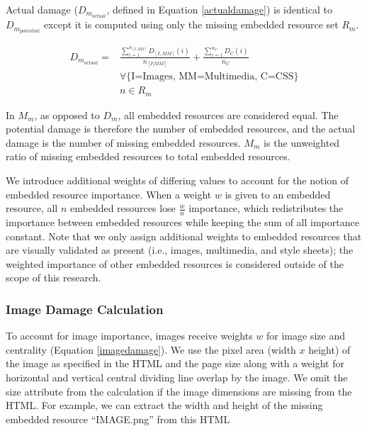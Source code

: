 Actual damage ($D_{m_{actual}}$, defined in Equation \ref{actualdamage}) is identical to $D_{m_{potential}}$ except it is computed using only the missing embedded resource set \emph{$R_m$}. %

\begin{equation}
\label{actualdamage}
\begin{split}
D_{m_{actual}} =& \frac{\sum_{i=1}^{n_{[I,MM]}} D_{[I,MM]}(i)}{n_{[I|MM]}} + \frac{\sum_{i=1}^{n_C} D_C(i)}{n_C} %
\\&\forall\{\text{I=Images, MM=Multimedia, C=CSS}\} \\&n \in R_m
\end{split}
\end{equation}


In $M_m$, as opposed to $D_m$, all embedded resources are considered equal. The potential damage is therefore the number of embedded resources, and the actual damage is the number of missing embedded resources. $M_m$ is the unweighted ratio of missing embedded resources to total embedded resources.

We introduce additional weights of differing values to account for the notion of embedded resource importance. When a weight $w$ is given to an embedded resource, all $n$ embedded resources lose $\frac{w}{n}$ importance, which redistributes the importance between embedded resources while keeping the sum of all importance constant. Note that we only assign additional weights to embedded resources that are visually validated as present (i.e., images, multimedia, and style sheets); the weighted importance of other embedded resources is considered outside of the scope of this research.

\subsubsection{Image Damage Calculation}
To account for image importance, images receive weights $w$ for image size and centrality (Equation \ref{imagedamage}). We use the pixel area (width $x$ height) of the image as specified in the HTML and the page size along with a weight for horizontal and vertical central dividing line overlap by the image. We omit the size attribute from the calculation if the image dimensions are missing from the HTML. For example, we can extract the width and height of the missing embedded resource ``IMAGE.png'' from this HTML

